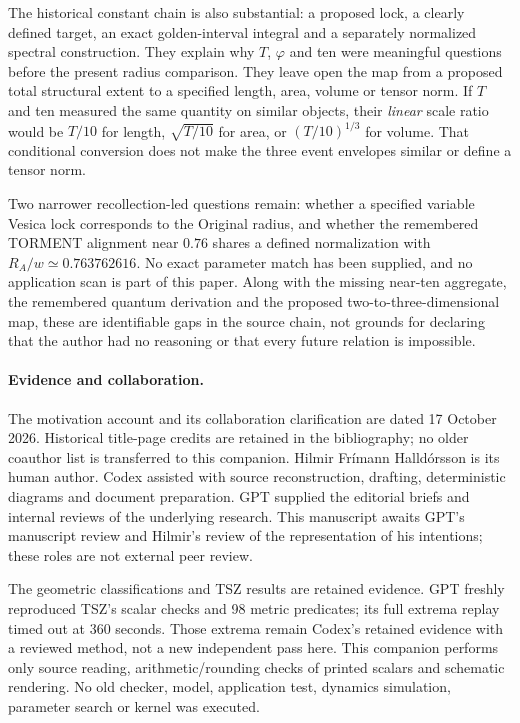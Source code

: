 \documentclass[11pt,a4paper]{article}
\newcommand{\ph}{\varphi}\newcommand{\Li}{\operatorname{Li}}\newcommand{\conv}{\operatorname{conv}}
\begin{document}
The historical constant chain is also substantial: a proposed lock, a clearly defined target, an exact golden-interval integral and a separately normalized spectral construction. They explain why $T$, $\ph$ and ten were meaningful questions before the present radius comparison. They leave open the map from a proposed total structural extent to a specified length, area, volume or tensor norm. If $T$ and ten measured the same quantity on similar objects, their \emph{linear} scale ratio would be $T/10$ for length, $\sqrt{T/10}$ for area, or $(T/10)^{1/3}$ for volume. That conditional conversion does not make the three event envelopes similar or define a tensor norm.~\cite[Sec.~14]{SP}

Two narrower recollection-led questions remain: whether a specified variable Vesica lock corresponds to the Original radius, and whether the remembered TORMENT alignment near $0.76$ shares a defined normalization with $R_A/w\simeq0.763762616$. No exact parameter match has been supplied, and no application scan is part of this paper. Along with the missing near-ten aggregate, the remembered quantum derivation and the proposed two-to-three-dimensional map, these are identifiable gaps in the source chain, not grounds for declaring that the author had no reasoning or that every future relation is impossible.~\cite{Intent}

\paragraph{Evidence and collaboration.}
The motivation account and its collaboration clarification are dated 17 October 2026. Historical title-page credits are retained in the bibliography; no older coauthor list is transferred to this companion. Hilmir Fr\'imann Halld\'orsson is its human author. Codex assisted with source reconstruction, drafting, deterministic diagrams and document preparation. GPT supplied the editorial briefs and internal reviews of the underlying research. This manuscript awaits GPT's manuscript review and Hilmir's review of the representation of his intentions; these roles are not external peer review.

The geometric classifications and TSZ results are retained evidence. GPT freshly reproduced TSZ's scalar checks and 98 metric predicates; its full extrema replay timed out at 360 seconds. Those extrema remain Codex's retained evidence with a reviewed method, not a new independent pass here. This companion performs only source reading, arithmetic/rounding checks of printed scalars and schematic rendering. No old checker, model, application test, dynamics simulation, parameter search or kernel was executed.~\cite{TSZReview}


\end{document}
